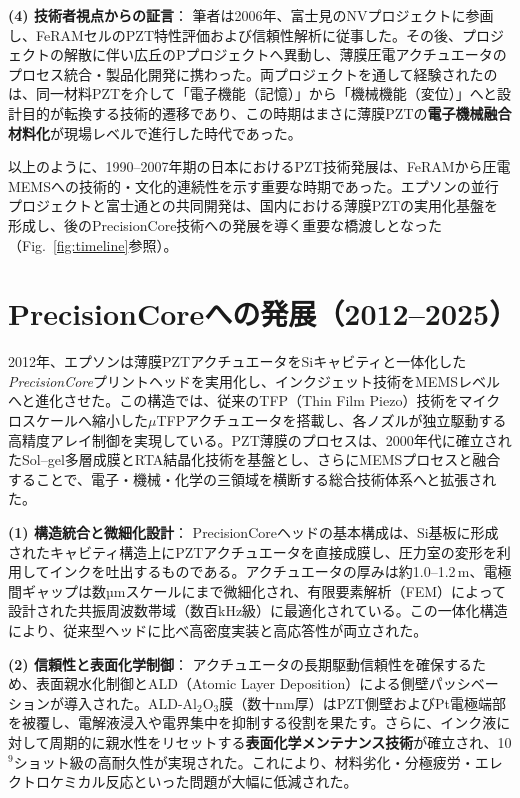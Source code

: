 \documentclass[conference]{IEEEtran}
\begin{document}
\medskip
\noindent
\textbf{(4) 技術者視点からの証言}：
筆者は2006年、富士見のNVプロジェクトに参画し、FeRAMセルのPZT特性評価および信頼性解析に従事した。その後、プロジェクトの解散に伴い広丘のPプロジェクトへ異動し、薄膜圧電アクチュエータのプロセス統合・製品化開発に携わった。両プロジェクトを通して経験されたのは、同一材料PZTを介して「電子機能（記憶）」から「機械機能（変位）」へと設計目的が転換する技術的遷移であり、この時期はまさに薄膜PZTの\textbf{電子機械融合材料化}が現場レベルで進行した時代であった。

\medskip
以上のように、1990--2007年期の日本におけるPZT技術発展は、FeRAMから圧電MEMSへの技術的・文化的連続性を示す重要な時期であった。エプソンの並行プロジェクトと富士通との共同開発は、国内における薄膜PZTの実用化基盤を形成し、後のPrecisionCore技術への発展を導く重要な橋渡しとなった（Fig.~\ref{fig:timeline}参照）。

\section{PrecisionCoreへの発展（2012--2025）}
2012年、エプソンは薄膜PZTアクチュエータをSiキャビティと一体化した\textit{PrecisionCore}プリントヘッドを実用化し、インクジェット技術をMEMSレベルへと進化させた\cite{uemura2014mems}。この構造では、従来のTFP（Thin Film Piezo）技術をマイクロスケールへ縮小した$\mu$TFPアクチュエータを搭載し、各ノズルが独立駆動する高精度アレイ制御を実現している。PZT薄膜のプロセスは、2000年代に確立されたSol--gel多層成膜とRTA結晶化技術を基盤とし、さらにMEMSプロセスと融合することで、電子・機械・化学の三領域を横断する総合技術体系へと拡張された。

\medskip
\noindent
\textbf{(1) 構造統合と微細化設計}：
PrecisionCoreヘッドの基本構成は、Si基板に形成されたキャビティ構造上にPZTアクチュエータを直接成膜し、圧力室の変形を利用してインクを吐出するものである。アクチュエータの厚みは約1.0--1.2\,\textmu m、電極間ギャップは数µmスケールにまで微細化され、有限要素解析（FEM）によって設計された共振周波数帯域（数百kHz級）に最適化されている。この一体化構造により、従来型ヘッドに比べ高密度実装と高応答性が両立された。

\medskip
\noindent
\textbf{(2) 信頼性と表面化学制御}：
アクチュエータの長期駆動信頼性を確保するため、表面親水化制御とALD（Atomic Layer Deposition）による側壁パッシベーションが導入された\cite{ishihara2016reliability}。ALD-Al$_2$O$_3$膜（数十nm厚）はPZT側壁およびPt電極端部を被覆し、電解液浸入や電界集中を抑制する役割を果たす。さらに、インク液に対して周期的に親水性をリセットする\textbf{表面化学メンテナンス技術}が確立され、10$^9$ショット級の高耐久性が実現された。これにより、材料劣化・分極疲労・エレクトロケミカル反応といった問題が大幅に低減された。
\end{document}
